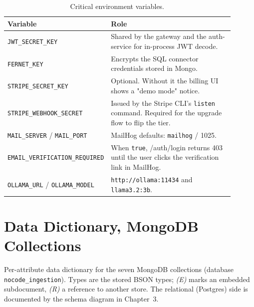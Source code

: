\documentclass[12pt, a4paper, oneside]{report}
\begin{document}
\begin{table}[H]
\centering
\caption{Critical environment variables.}
\label{tab:env_vars}
\begin{tabular}{|p{0.32\linewidth}|L{0.58\linewidth}|}
\hline
\textbf{Variable} & \textbf{Role} \\ \hline
\texttt{JWT\_SECRET\_KEY} & Shared by the gateway and the auth-service for in-process JWT decode. \\ \hline
\texttt{FERNET\_KEY} & Encrypts the SQL connector credentials stored in Mongo. \\ \hline
\texttt{STRIPE\_SECRET\_KEY} & Optional. Without it the billing UI shows a "demo mode" notice. \\ \hline
\texttt{STRIPE\_WEBHOOK\_SECRET} & Issued by the Stripe CLI's \texttt{listen} command. Required for the upgrade flow to flip the tier. \\ \hline
\texttt{MAIL\_SERVER} / \texttt{MAIL\_PORT} & MailHog defaults: \texttt{mailhog} / 1025. \\ \hline
\texttt{EMAIL\_VERIFICATION\_REQUIRED} & When \texttt{true}, /auth/login returns 403 until the user clicks the verification link in MailHog. \\ \hline
\texttt{OLLAMA\_URL} / \texttt{OLLAMA\_MODEL} & \texttt{http://ollama:11434} and \texttt{llama3.2:3b}. \\ \hline
\end{tabular}
\end{table}

\chapter{Data Dictionary, MongoDB Collections}
\label{annex:datadict}

Per-attribute data dictionary for the seven MongoDB collections
(database \texttt{nocode\_ingestion}). Types are the stored BSON types;
\textit{(E)} marks an embedded subdocument, \textit{(R)} a reference to
another store. The relational (Postgres) side is documented by the
schema diagram in Chapter~3.
\end{document}
